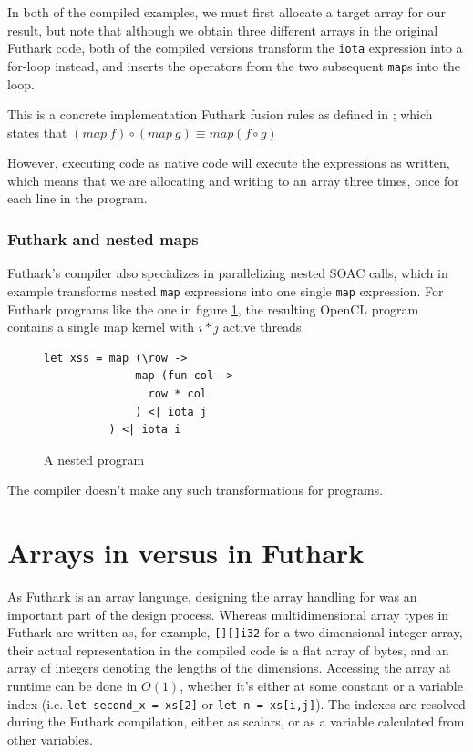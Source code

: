 In both of the compiled examples, we must first allocate a target array for our
result, but note that although we obtain three different arrays in the original
Futhark code, both of the compiled versions transform the \texttt{iota}
expression into a for-loop instead, and inserts the operators from the two
subsequent \texttt{map}s into the loop.

This is a concrete implementation Futhark fusion rules as defined in \cite{pldi17}; which states
that $(map~f) \circ (map~g) \equiv map (f \circ g)$

However, executing \fshark{} code as native \fsharp{} code will execute the
expressions as written, which means that we are allocating and writing to an
array three times, once for each line in the program.

\subsubsection*{Futhark and nested maps}
Futhark's compiler also specializes in parallelizing nested SOAC
calls\cite{pldi17}, which in example transforms nested \texttt{map} expressions into one
single \texttt{map} expression. For Futhark programs like the one in figure
\ref{fig:fsharpnested}, the resulting OpenCL program contains a single map
kernel with $i * j$ active threads.

\begin{figure}[h]
  \centering
\begin{verbatim}
let xss = map (\row ->
              map (fun col ->
                row * col
              ) <| iota j
          ) <| iota i
\end{verbatim}
  \caption{A nested \fshark{} program}
  \label{fig:fsharpnested}
\end{figure}

The \fsharp{} compiler doesn't make any such transformations for \fshark{} programs.

\section{Arrays in \fsharp{} versus in Futhark}

As Futhark is an array language, designing the array handling for \fshark{} was
an important part of the design process.
Whereas multidimensional array types in Futhark are written as, for example,
\texttt{[][]i32} for a two dimensional integer array, their actual representation 
in the compiled code is a flat array of bytes, and an array of integers denoting 
the lengths of the dimensions.
Accessing the array at runtime can be done in $O(1)$, whether it's
either at some constant or a variable index (i.e. \texttt{let second\_x = xs[2]} or \texttt{let n = xs[i,j]}).
The indexes are resolved during the Futhark compilation, either as scalars, or
as a variable calculated from other variables.


